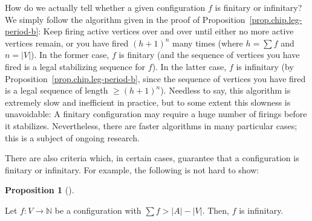 \documentclass[numbers=enddot,12pt,final,onecolumn,notitlepage]{scrartcl}%
\theoremstyle{definition}
\newtheorem{prop}[theo]{Proposition}
\newenvironment{proposition}[1][]
{\begin{prop}[#1]\begin{leftbar}}
{\end{leftbar}\end{prop}}
\let\sumnonlimits\sum
\renewcommand{\sum}{\sumnonlimits\limits}
\newcommand{\NN}{\mathbb{N}}
\newcommand{\abs}[1]{\left| #1 \right|}
\newcommand{\tup}[1]{\left( #1 \right)}
\begin{document}
How do we actually tell whether a given configuration $f$
is finitary or infinitary?
We simply follow the algorithm given in the proof of
Proposition~\ref{prop.chip.leg-period-b}:
Keep firing active vertices over and over until either no
more active vertices remain, or you have fired
$\tup{h+1}^n$ many times
(where $h = \sum f$ and $n = \abs{V}$).
In the former case, $f$ is finitary (and the sequence
of vertices you have fired is a legal stabilizing sequence
for $f$).
In the latter case, $f$ is infinitary (by
Proposition~\ref{prop.chip.leg-period-b},
since the sequence of vertices you have fired is a
legal sequence of length $\geq \tup{h+1}^n$).
Needless to say, this algorithm is extremely slow and
inefficient in practice, but to some extent this slowness
is unavoidable:
A finitary configuration may require a huge number of firings
before it stabilizes.
Nevertheless, there are faster algorithms in many particular
cases; this is a subject of ongoing research.

There are also criteria which, in certain cases, guarantee
that a configuration is finitary or infinitary.
For example, the following is not hard to show:

\begin{proposition} \label{prop.chip.infinitary-by-pigeon}
Let $f : V \to \NN$ be a
configuration with $\sum f > \abs{A} - \abs{V}$.
Then, $f$ is infinitary.
\end{proposition}
\end{document}
